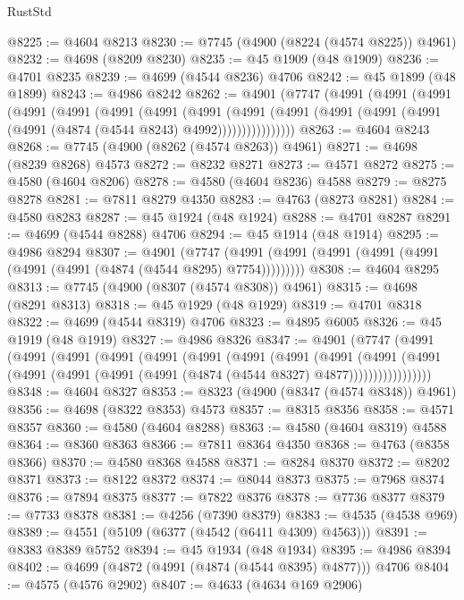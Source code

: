 \begin{lexlean}{RustStd}
\begin{coremodule}
@8225 := @4604 @8213
@8230 := @7745 (@4900 (@8224 (@4574 @8225)) @4961)
@8232 := @4698 (@8209 @8230)
@8235 := @45 @1909 (@48 @1909)
@8236 := @4701 @8235
@8239 := @4699 (@4544 @8236) @4706
@8242 := @45 @1899 (@48 @1899)
@8243 := @4986 @8242
@8262 := @4901
    (@7747
      (@4991
        (@4991
          (@4991
            (@4991
              (@4991
                (@4991
                  (@4991
                    (@4991
                      (@4991
                        (@4991
                          (@4991 (@4991 (@4991 (@4991 (@4874 (@4544 @8243) @4992))))))))))))))))
@8263 := @4604 @8243
@8268 := @7745 (@4900 (@8262 (@4574 @8263)) @4961)
@8271 := @4698 (@8239 @8268) @4573
@8272 := @8232 @8271
@8273 := @4571 @8272
@8275 := @4580 (@4604 @8206)
@8278 := @4580 (@4604 @8236) @4588
@8279 := @8275 @8278
@8281 := @7811 @8279 @4350
@8283 := @4763 (@8273 @8281)
@8284 := @4580 @8283
@8287 := @45 @1924 (@48 @1924)
@8288 := @4701 @8287
@8291 := @4699 (@4544 @8288) @4706
@8294 := @45 @1914 (@48 @1914)
@8295 := @4986 @8294
@8307 := @4901
    (@7747 (@4991 (@4991 (@4991 (@4991 (@4991 (@4991 (@4991 (@4874 (@4544 @8295) @7754)))))))))
@8308 := @4604 @8295
@8313 := @7745 (@4900 (@8307 (@4574 @8308)) @4961)
@8315 := @4698 (@8291 @8313)
@8318 := @45 @1929 (@48 @1929)
@8319 := @4701 @8318
@8322 := @4699 (@4544 @8319) @4706
@8323 := @4895 @6005
@8326 := @45 @1919 (@48 @1919)
@8327 := @4986 @8326
@8347 := @4901
    (@7747
      (@4991
        (@4991
          (@4991
            (@4991
              (@4991
                (@4991
                  (@4991
                    (@4991
                      (@4991
                        (@4991
                          (@4991
                            (@4991 (@4991 (@4991 (@4991 (@4874 (@4544 @8327) @4877)))))))))))))))))
@8348 := @4604 @8327
@8353 := @8323 (@4900 (@8347 (@4574 @8348)) @4961)
@8356 := @4698 (@8322 @8353) @4573
@8357 := @8315 @8356
@8358 := @4571 @8357
@8360 := @4580 (@4604 @8288)
@8363 := @4580 (@4604 @8319) @4588
@8364 := @8360 @8363
@8366 := @7811 @8364 @4350
@8368 := @4763 (@8358 @8366)
@8370 := @4580 @8368 @4588
@8371 := @8284 @8370
@8372 := @8202 @8371
@8373 := @8122 @8372
@8374 := @8044 @8373
@8375 := @7968 @8374
@8376 := @7894 @8375
@8377 := @7822 @8376
@8378 := @7736 @8377
@8379 := @7733 @8378
@8381 := @4256 (@7390 @8379)
@8383 := @4535 (@4538 @969)
@8389 := @4551 (@5109 (@6377 (@4542 (@6411 @4309) @4563)))
@8391 := @8383 @8389 @5752
@8394 := @45 @1934 (@48 @1934)
@8395 := @4986 @8394
@8402 := @4699 (@4872 (@4991 (@4874 (@4544 @8395) @4877))) @4706
@8404 := @4575 (@4576 @2902)
@8407 := @4633 (@4634 @169 @2906)

\end{coremodule}
\end{lexlean}
